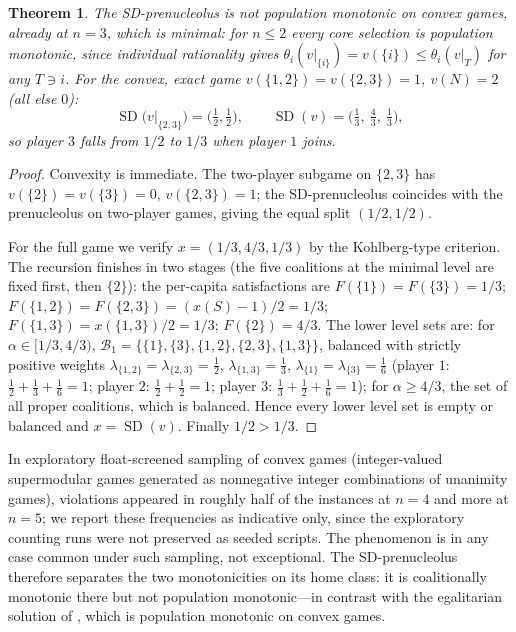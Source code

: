 \documentclass[11pt]{article}
\newtheorem{theorem}{Theorem}[section]
\newcommand{\SD}{\operatorname{SD}}
\begin{document}
\begin{theorem}\label{thm:sdpm}
The SD-prenucleolus is not population monotonic on convex games, already at
$n=3$, which is minimal: for $n\le 2$ every core selection is population
monotonic, since individual rationality gives
$\theta_i(v|_{\{i\}})=v(\{i\})\le\theta_i(v|_T)$ for any $T\ni i$. For the
convex, exact game
$v(\{1,2\})=v(\{2,3\})=1$, $v(N)=2$ (all else $0$):
\[
\SD\bigl(v|_{\{2,3\}}\bigr)=\bigl(\tfrac12,\tfrac12\bigr),\qquad
\SD(v)=\bigl(\tfrac13,\ \tfrac43,\ \tfrac13\bigr),
\]
so player $3$ falls from $1/2$ to $1/3$ when player $1$ joins.
\end{theorem}

\begin{proof}
Convexity is immediate. The two-player subgame on $\{2,3\}$ has
$v(\{2\})=v(\{3\})=0$, $v(\{2,3\})=1$; the SD-prenucleolus coincides with
the prenucleolus on two-player games, giving the equal split $(1/2,1/2)$.

For the full game we verify $x=(1/3,4/3,1/3)$ by the Kohlberg-type
criterion. The recursion finishes in two stages (the five coalitions at the
minimal level are fixed first, then $\{2\}$): the per-capita satisfactions
are $F(\{1\})=F(\{3\})=1/3$;
$F(\{1,2\})=F(\{2,3\})=(x(S)-1)/2=1/3$; $F(\{1,3\})=x(\{1,3\})/2=1/3$;
$F(\{2\})=4/3$. The lower level sets are: for $\alpha\in[1/3,4/3)$,
$\mathcal{B}_1=\{\{1\},\{3\},\{1,2\},\{2,3\},\{1,3\}\}$, balanced with
strictly positive weights
$\lambda_{\{1,2\}}=\lambda_{\{2,3\}}=\tfrac12$,
$\lambda_{\{1,3\}}=\tfrac13$, $\lambda_{\{1\}}=\lambda_{\{3\}}=\tfrac16$
(player $1$: $\tfrac12+\tfrac13+\tfrac16=1$; player $2$:
$\tfrac12+\tfrac12=1$; player $3$: $\tfrac13+\tfrac12+\tfrac16=1$); for
$\alpha\ge 4/3$, the set of all proper coalitions, which is balanced. Hence
every lower level set is empty or balanced and $x=\SD(v)$. Finally
$1/2>1/3$.
\end{proof}

In exploratory float-screened sampling of convex games (integer-valued
supermodular games generated as nonnegative integer combinations of
unanimity games), violations appeared in roughly half of the instances at
$n=4$ and more at $n=5$; we report these frequencies as indicative only,
since the exploratory counting runs were not preserved as seeded scripts.
The phenomenon is in any case common under such sampling, not exceptional. The SD-prenucleolus therefore
separates the two monotonicities on its home class: it is coalitionally
monotonic there \citep{ArinKatsev2016} but not population monotonic---in
contrast with the egalitarian solution of \citet{DuttaRay89}, which is
population monotonic on convex games.
\end{document}
